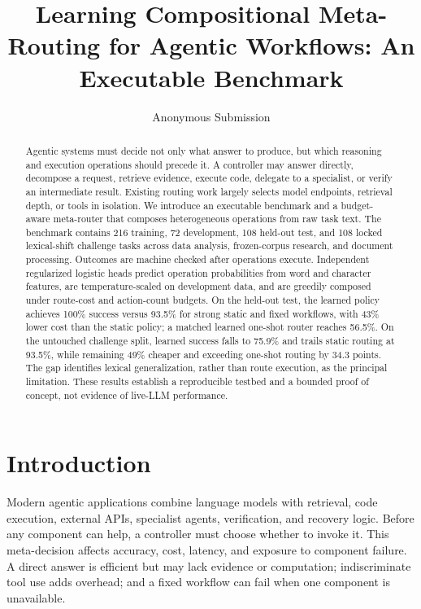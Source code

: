 \documentclass[letterpaper]{article} %
\title{Learning Compositional Meta-Routing for Agentic Workflows: An Executable Benchmark}
\author{Anonymous Submission}
\begin{document}
\maketitle

\begin{abstract}
Agentic systems must decide not only what answer to produce, but which reasoning and execution operations should precede it. A controller may answer directly, decompose a request, retrieve evidence, execute code, delegate to a specialist, or verify an intermediate result. Existing routing work largely selects model endpoints, retrieval depth, or tools in isolation. We introduce an executable benchmark and a budget-aware meta-router that composes heterogeneous operations from raw task text. The benchmark contains 216 training, 72 development, 108 held-out test, and 108 locked lexical-shift challenge tasks across data analysis, frozen-corpus research, and document processing. Outcomes are machine checked after operations execute. Independent regularized logistic heads predict operation probabilities from word and character features, are temperature-scaled on development data, and are greedily composed under route-cost and action-count budgets. On the held-out test, the learned policy achieves 100\% success versus 93.5\% for strong static and fixed workflows, with 43\% lower cost than the static policy; a matched learned one-shot router reaches 56.5\%. On the untouched challenge split, learned success falls to 75.9\% and trails static routing at 93.5\%, while remaining 49\% cheaper and exceeding one-shot routing by 34.3 points. The gap identifies lexical generalization, rather than route execution, as the principal limitation. These results establish a reproducible testbed and a bounded proof of concept, not evidence of live-LLM performance.
\end{abstract}


\section{Introduction}

Modern agentic applications combine language models with retrieval, code execution, external APIs, specialist agents, verification, and recovery logic. Before any component can help, a controller must choose whether to invoke it. This meta-decision affects accuracy, cost, latency, and exposure to component failure. A direct answer is efficient but may lack evidence or computation; indiscriminate tool use adds overhead; and a fixed workflow can fail when one component is unavailable.
\end{document}
